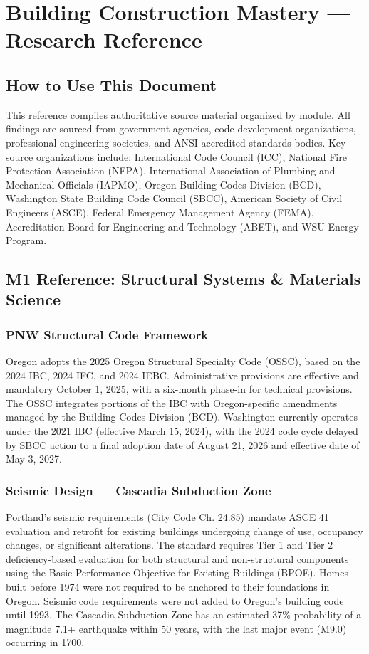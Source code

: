 \documentclass[11pt,letterpaper]{article}
\begin{document}
\section{Building Construction Mastery --- Research Reference}

\subsection{How to Use This Document}

This reference compiles authoritative source material organized by module. All findings are sourced from government agencies, code development organizations, professional engineering societies, and ANSI-accredited standards bodies. Key source organizations include: International Code Council (ICC), National Fire Protection Association (NFPA), International Association of Plumbing and Mechanical Officials (IAPMO), Oregon Building Codes Division (BCD), Washington State Building Code Council (SBCC), American Society of Civil Engineers (ASCE), Federal Emergency Management Agency (FEMA), Accreditation Board for Engineering and Technology (ABET), and WSU Energy Program.

\subsection{M1 Reference: Structural Systems \& Materials Science}

\subsubsection{PNW Structural Code Framework}

Oregon adopts the 2025 Oregon Structural Specialty Code (OSSC), based on the 2024 IBC, 2024 IFC, and 2024 IEBC. Administrative provisions are effective and mandatory October 1, 2025, with a six-month phase-in for technical provisions. The OSSC integrates portions of the IBC with Oregon-specific amendments managed by the Building Codes Division (BCD). Washington currently operates under the 2021 IBC (effective March 15, 2024), with the 2024 code cycle delayed by SBCC action to a final adoption date of August 21, 2026 and effective date of May 3, 2027.

\subsubsection{Seismic Design --- Cascadia Subduction Zone}

Portland's seismic requirements (City Code Ch. 24.85) mandate ASCE 41 evaluation and retrofit for existing buildings undergoing change of use, occupancy changes, or significant alterations. The standard requires Tier 1 and Tier 2 deficiency-based evaluation for both structural and non-structural components using the Basic Performance Objective for Existing Buildings (BPOE). Homes built before 1974 were not required to be anchored to their foundations in Oregon. Seismic code requirements were not added to Oregon's building code until 1993. The Cascadia Subduction Zone has an estimated 37\% probability of a magnitude 7.1+ earthquake within 50 years, with the last major event (M9.0) occurring in 1700.
\end{document}
